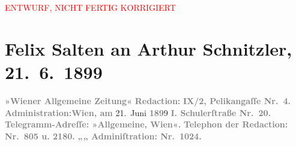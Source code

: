 
\begin{center}
            \textcolor{red}{ENTWURF, NICHT FERTIG KORRIGIERT}
                      \end{center}
            
         
         \renewcommand{\erwaehntePersonen}{Personen: Paul Goldmann, Georg Hirschfeld, Hugo von Hofmannsthal, Gustav Schwarzkopf}
         \renewcommand{\erwaehnteInstitutionen}{Institutionen: Burgtheater, Wiener Allgemeine Montagszeitung, Wiener Allgemeine Zeitung}
         \renewcommand{\erwaehnteOrte}{Orte: Berlin, Pelikangasse, Schulerstraße, Wien}
         \renewcommand{\erwaehnteWerke}{}
               \section[Felix Salten an Arthur Schnitzler, 21. 6. 1899]{ Felix Salten an Arthur Schnitzler, 21. 6. 1899}\nopagebreak{}\rehead{ }\begin{ledgroupsized}[t]{13cm}\normalsize\beginnumbering \toendnotes[C]{\smallbreak\pagebreak[2]} 
\pstart
           \noindent{}{\pb}\textcolor{gray}{\textbf{\textbf{»Wiener Allgemeine
                        Zeitung«}}}\pend
           \pstart
           \textcolor{gray}{\textbf{Redaction:}}\pend
           \pstart
           \textcolor{gray}{\textbf{\textbf{IX/2, Pelikangaſſe Nr. 4.}}}\pend
           \pstart
           \textcolor{gray}{\textbf{Administration:}}\hfill \textcolor{gray}{\textbf{Wien, am}}{ }21. Juni \textcolor{gray}{\textbf{189}}9\pend
           \pstart
           \textcolor{gray}{\textbf{\textbf{I. Schulerſtraße Nr. 20. }}}\pend
           \pstart
           \textcolor{gray}{\textbf{Telegramm-Adreſſe: »Allgemeine, Wien«.}}\pend
           \pstart
           \textcolor{gray}{\textbf{Telephon der Redaction: Nr. 805 u. 2180.}}\pend
           \pstart
           \textcolor{gray}{\textbf{\hspace*{2.5em}„\hspace*{2.5em}„\hspace*{2.5em} Adminiſtration: Nr. 1024.}}\pend

\end{ledgroupsized}
